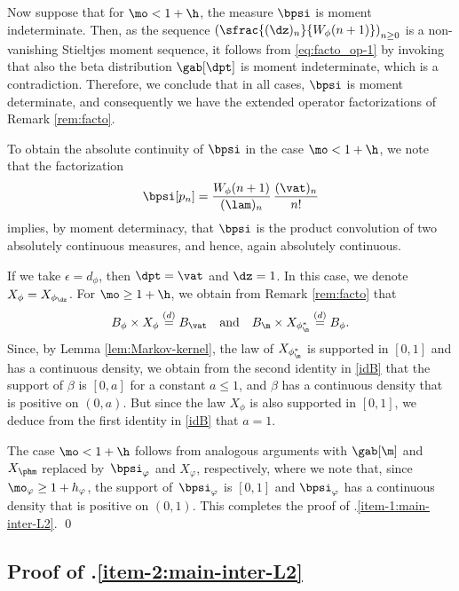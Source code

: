 Now suppose that for $\mo < 1+\h$, the measure $\bpsi$ is moment indeterminate. Then, as the sequence $\left(\sfrac{(\dz)_n}{W_{\phi}(n+1)}\right)_{n \geq 0}$ is a non-vanishing Stieltjes moment sequence, it follows from \eqref{eq:facto_op-1} by invoking \cite[Lem.\,2.2]{Berg} that also the beta distribution $\gab[\dpt]$ is moment indeterminate, which is a contradiction. Therefore, we conclude that in all cases, $\bpsi$ is moment determinate, and consequently we have the extended operator factorizations of Remark \ref{rem:facto}.

To obtain the absolute continuity of $\bpsi$ in the case $\mo < 1+\h$, we note that the factorization\vspace*{-3pt}
\[
\bpsi [p_n] = \frac{W_{\phi}(n+1)}{(\lam)_n}\,\frac{(\vat)_n}{n!}
\]
implies, by moment determinacy, that $\bpsi$ is the product convolution of two absolutely continuous measures, and hence, again absolutely continuous.

If we take $\epsilon = d_\phi$, then $\dpt = \vat$ and $\dz = 1$. In this case, we denote
$X_{\phi} = X_{\phi_{\dz}}$. For $\mo \ge 1 + \h$, we obtain from Remark \ref{rem:facto} that\vspace*{-3pt}
\begin{equation} \label{idB}
B_\phi \times X_{\phi} \stackrel{(d)}{=} B_{\vat} \quad \mbox{and} \quad
B_{\m} \times X_{\phi^*_{\m}} \stackrel{(d)}{=} B_{\phi}.
\end{equation}
Since, by Lemma \ref{lem:Markov-kernel}, the law of $X_{\phi^*_{\m}}$ is supported in $[0,1]$
and has a continuous density, we obtain from the second identity in \eqref{idB} that
the support of $\beta$ is $[0,a]$ for a constant $a \le 1$, and $\beta$ has a continuous
density that is positive on $(0,a)$. But since the law $X_{\phi}$ is also supported in $[0,1]$,
we deduce from the first identity in \eqref{idB} that $a = 1$.

The case $\mo < 1+\h$ follows from analogous arguments with $\gab[\m]$ and $X_{\phm}$ replaced by~$\bpsi_\varphi$ and $X_\varphi$, respectively, where we note that, since $\mo_\varphi \geq 1+h_\varphi$, the support of~$\bpsi_\varphi$ is $[0,1]$ and $\bpsi_\varphi$ has a continuous density that is positive on $(0,1)$. This completes the proof of .\eqref{item-1:main-inter-L2}. \qed

\subsection{Proof of .\eqref{item-2:main-inter-L2}}


